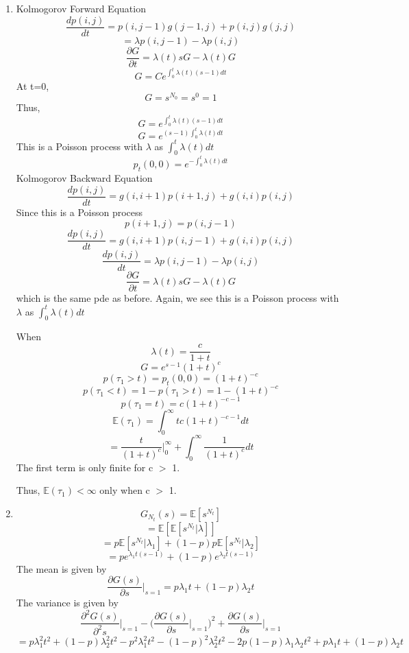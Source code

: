 \documentclass[a4paper,11pt]{article}
\begin{document}
\begin{enumerate}
\item
Kolmogorov Forward Equation
\[\frac{dp(i,j)}{dt} = p(i,j-1)g(j-1,j) +p(i,j)g(j,j)\]
\[= \lambda p(i,j-1) -\lambda p(i,j)\]
\[\frac{\partial G}{\partial t}=\lambda(t) s G - \lambda(t) G \]
\[G = C e^{\int_0^t \lambda(t) (s-1) dt}\]
At t=0, 
\[G = s^{N_0}=s^{0}=1\]
Thus,
\[G = e^{\int_0^t \lambda(t) (s-1) dt}\]
\[G = e^{(s-1) \int_0^t \lambda(t)  dt}\]
This is a Poisson process with $\lambda$ as $\int_0^t \lambda(t)  dt$
\[p_t(0,0) = e^{- \int_0^t \lambda(t) dt} \]
Kolmogorov Backward Equation
\[\frac{dp(i,j)}{dt} = g(i,i+1)p(i+1,j) +g(i,i)p(i,j)\]
Since this is a Poisson process
\[p(i+1,j) = p(i,j-1)\]
\[\frac{dp(i,j)}{dt} = g(i,i+1)p(i,j-1) +g(i,i)p(i,j)\]
\[\frac{dp(i,j)}{dt} = \lambda p(i,j-1) - \lambda p(i,j)\]
\[\frac{\partial G}{\partial t}=\lambda(t) s G - \lambda(t) G \]
which is the same pde as before.
Again, we see this is a Poisson process with $\lambda$ as $\int_0^t \lambda(t)  dt$


When 
\[\lambda(t) = \frac{c}{1+t}\]
\[G = e^{s-1} (1+t)^c\]
\[p(\tau_1 > t) = p_t(0,0) =  (1+t)^{-c}\]
\[p(\tau_1 < t) = 1 - p(\tau_1 > t) = 1 - (1+t)^{-c}\]
\[p(\tau_1 = t) = c (1+t)^{-c-1}\]
\[\mathbb{E}(\tau_1) = \int_0^\infty tc(1+t)^{-c-1} dt\]
\[= \frac{t}{(1+t)^c}\bigg|_0^\infty + \int_0^\infty \frac{1}{(1+t)^c} dt\]
The first term is only finite for c $>$ 1.

Thus, $\mathbb{E}(\tau_1)<\infty$ only when c $>$ 1.


\item 
\[G_{N_t}(s) = \mathbb{E}[s^{N_t}]\]
\[= \mathbb{E}[\mathbb{E}[s^{N_t}|\lambda ] ]\]
\[= p \mathbb{E}[s^{N_t}|\lambda_1] + (1-p) p \mathbb{E}[s^{N_t}|\lambda_2]\]
\[= p e^{\lambda_1 t (s-1)} + (1-p)e^{\lambda_2 t (s-1)}\]
The mean is given by 
\[\frac{\partial G(s)}{\partial s}\bigg|_{s=1} = p\lambda_1 t +(1-p)\lambda_2 t  \]
The variance is given by 
\[\frac{\partial^2 G(s)}{\partial^2 s}\bigg|_{s=1} - \bigg(\frac{\partial G(s)}{\partial s}\bigg|_{s=1}\bigg)^2 +\frac{\partial G(s)}{\partial s}\bigg|_{s=1}  \]
\[= p\lambda_1^2 t^2 +(1-p)\lambda_2^2 t^2 -p^2\lambda_1^2 t^2 -(1-p)^2\lambda_2^2 t^2-2 p(1-p)\lambda_1\lambda_2 t^2 +p\lambda_1 t +(1-p)\lambda_2 t  \] 


\end{enumerate}
\end{document}
